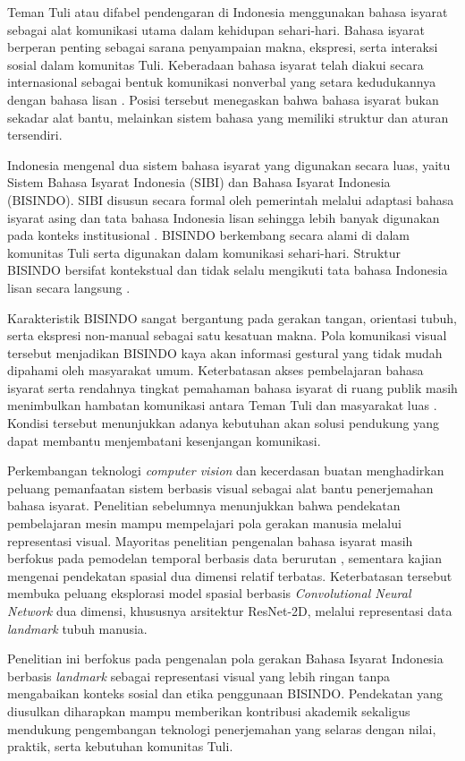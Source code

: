 Teman Tuli atau difabel pendengaran di Indonesia menggunakan bahasa isyarat sebagai alat komunikasi utama dalam kehidupan sehari-hari.
Bahasa isyarat berperan penting sebagai sarana penyampaian makna, ekspresi, serta interaksi sosial dalam komunitas Tuli.
Keberadaan bahasa isyarat telah diakui secara internasional sebagai bentuk komunikasi nonverbal yang setara kedudukannya dengan bahasa lisan \cite{verushka2024signlanguages}.
Posisi tersebut menegaskan bahwa bahasa isyarat bukan sekadar alat bantu, melainkan sistem bahasa yang memiliki struktur dan aturan tersendiri.

Indonesia mengenal dua sistem bahasa isyarat yang digunakan secara luas, yaitu Sistem Bahasa Isyarat Indonesia (SIBI) dan Bahasa Isyarat Indonesia (BISINDO).
SIBI disusun secara formal oleh pemerintah melalui adaptasi bahasa isyarat asing dan tata bahasa Indonesia lisan sehingga lebih banyak digunakan pada konteks institusional \cite{saraswati2022bisindo}.
BISINDO berkembang secara alami di dalam komunitas Tuli serta digunakan dalam komunikasi sehari-hari.
Struktur BISINDO bersifat kontekstual dan tidak selalu mengikuti tata bahasa Indonesia lisan secara langsung \cite{nilawaty2020sibi, bentara2024sibi-bisindo}.

Karakteristik BISINDO sangat bergantung pada gerakan tangan, orientasi tubuh, serta ekspresi non-manual sebagai satu kesatuan makna.
Pola komunikasi visual tersebut menjadikan BISINDO kaya akan informasi gestural yang tidak mudah dipahami oleh masyarakat umum.
Keterbatasan akses pembelajaran bahasa isyarat serta rendahnya tingkat pemahaman bahasa isyarat di ruang publik masih menimbulkan hambatan komunikasi antara Teman Tuli dan masyarakat luas \cite{lavenia2023tuliindonesia, arlinta2020keterbatasan}.
Kondisi tersebut menunjukkan adanya kebutuhan akan solusi pendukung yang dapat membantu menjembatani kesenjangan komunikasi.

Perkembangan teknologi \textit{computer vision} dan kecerdasan buatan menghadirkan peluang pemanfaatan sistem berbasis visual sebagai alat bantu penerjemahan bahasa isyarat.
Penelitian sebelumnya menunjukkan bahwa pendekatan pembelajaran mesin mampu mempelajari pola gerakan manusia melalui representasi visual.
Mayoritas penelitian pengenalan bahasa isyarat masih berfokus pada pemodelan temporal berbasis data berurutan \cite{utomo2025islslstm, anturkar2025lstm3dcnn, maheswara2023lstmbisindo}, sementara kajian mengenai pendekatan spasial dua dimensi relatif terbatas.
Keterbatasan tersebut membuka peluang eksplorasi model spasial berbasis \textit{Convolutional Neural Network} dua dimensi, khususnya arsitektur ResNet-2D, melalui representasi data \textit{landmark} tubuh manusia.

Penelitian ini berfokus pada pengenalan pola gerakan Bahasa Isyarat Indonesia berbasis \textit{landmark} sebagai representasi visual yang lebih ringan tanpa mengabaikan konteks sosial dan etika penggunaan BISINDO.
Pendekatan yang diusulkan diharapkan mampu memberikan kontribusi akademik sekaligus mendukung pengembangan teknologi penerjemahan yang selaras dengan nilai, praktik, serta kebutuhan komunitas Tuli.